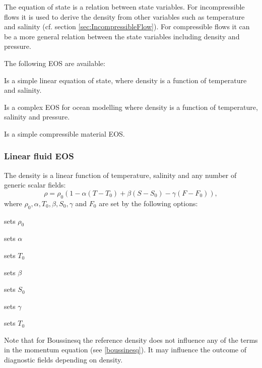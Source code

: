 The equation of state is a relation between state 
variables. For incompressible flows it is used to derive the density
from other variables such as temperature and salinity (cf. section \ref{sec:IncompressibleFlow}). For compressible
flows it can be a more general relation between the state variables
including density and pressure.

The following EOS are available:

\begin{description}
\item{} 
Is a simple linear equation of state,
where density is a function of temperature and salinity.

\item{} Is a complex EOS for ocean modelling where density is a function of temperature, salinity and pressure.
\item{} Is a simple compressible material EOS.
\end{description}

\subsubsection{Linear fluid EOS}
The density is a linear function of temperature, salinity and any number of generic scalar fields:
\begin{equation}
  \rho=\rho_0 \left(1-\alpha(T-T_0)+\beta (S-S_0) - \gamma (F - F_0) \right),
\end{equation}
where $\rho_0, \alpha, T_0, \beta, S_0, \gamma$ and $F_0$ are set by the following 
options:
\begin{description}
\item {} sets $\rho_0$
\item {} sets $\alpha$
\item {} sets $T_0$
\item {} sets $\beta$
\item {} sets $S_0$
\item {} sets $\gamma$
\item {} sets $T_0$
\end{description}
Note that for Boussinesq the reference density does not 
influence any of the terms in the 
momentum equation (see \eqref{boussinesq}). It may influence the outcome
of diagnostic fields depending on density.

